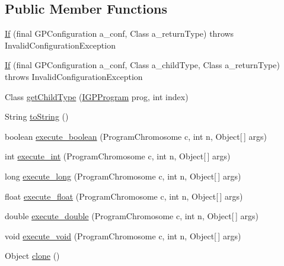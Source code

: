 \subsection*{Public Member Functions}
\begin{DoxyCompactItemize}
\item 
\hyperlink{classorg_1_1jgap_1_1gp_1_1function_1_1_if_a6395da7abcaa5ebdf130c931f022fee2}{If} (final G\-P\-Configuration a\-\_\-conf, Class a\-\_\-return\-Type)  throws Invalid\-Configuration\-Exception 
\item 
\hyperlink{classorg_1_1jgap_1_1gp_1_1function_1_1_if_afa35d660bdeb527018136a10f1d40b03}{If} (final G\-P\-Configuration a\-\_\-conf, Class a\-\_\-child\-Type, Class a\-\_\-return\-Type)  throws Invalid\-Configuration\-Exception 
\item 
Class \hyperlink{classorg_1_1jgap_1_1gp_1_1function_1_1_if_a026561e392289901587231949e866a3d}{get\-Child\-Type} (\hyperlink{interfaceorg_1_1jgap_1_1gp_1_1_i_g_p_program}{I\-G\-P\-Program} prog, int index)
\item 
String \hyperlink{classorg_1_1jgap_1_1gp_1_1function_1_1_if_a297ed019ab2642fed43a6192543d4b0c}{to\-String} ()
\item 
boolean \hyperlink{classorg_1_1jgap_1_1gp_1_1function_1_1_if_a257f8deb3285bd2fc36574734fa4de15}{execute\-\_\-boolean} (Program\-Chromosome c, int n, Object\mbox{[}$\,$\mbox{]} args)
\item 
int \hyperlink{classorg_1_1jgap_1_1gp_1_1function_1_1_if_a989cc6600c9fe346227facf5d08d970f}{execute\-\_\-int} (Program\-Chromosome c, int n, Object\mbox{[}$\,$\mbox{]} args)
\item 
long \hyperlink{classorg_1_1jgap_1_1gp_1_1function_1_1_if_a27e047494fe6b16524842215243da0b6}{execute\-\_\-long} (Program\-Chromosome c, int n, Object\mbox{[}$\,$\mbox{]} args)
\item 
float \hyperlink{classorg_1_1jgap_1_1gp_1_1function_1_1_if_a51484c8b750cd7e8b89321f655ec1f41}{execute\-\_\-float} (Program\-Chromosome c, int n, Object\mbox{[}$\,$\mbox{]} args)
\item 
double \hyperlink{classorg_1_1jgap_1_1gp_1_1function_1_1_if_a396043414165118867532eea495b6ffb}{execute\-\_\-double} (Program\-Chromosome c, int n, Object\mbox{[}$\,$\mbox{]} args)
\item 
void \hyperlink{classorg_1_1jgap_1_1gp_1_1function_1_1_if_a3b36ce8fb25456894c4bb2d136bfc5ef}{execute\-\_\-void} (Program\-Chromosome c, int n, Object\mbox{[}$\,$\mbox{]} args)
\item 
Object \hyperlink{classorg_1_1jgap_1_1gp_1_1function_1_1_if_a178879a6d37281c6f239fef776e32d48}{clone} ()
\end{DoxyCompactItemize}

